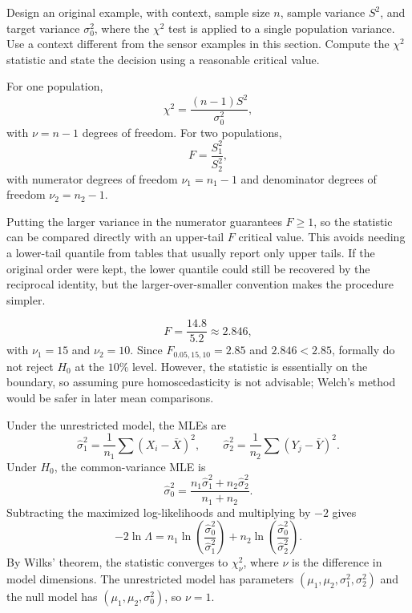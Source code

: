 \begin{problema}\label{prob:a0ad324}
Design an original example, with context, sample size $n$, sample variance $S^2$, and target variance $\sigma_0^2$, where the $\chi^2$ test is applied to a single population variance. Use a context different from the sensor examples in this section. Compute the $\chi^2$ statistic and state the decision using a reasonable critical value.
\end{problema}

\begin{solproblema}[prob:246a30e]
For one population,
\[
	\chi^2=\frac{(n-1)S^2}{\sigma_0^2},
\]
with $\nu=n-1$ degrees of freedom. For two populations,
\[
	F=\frac{S_1^2}{S_2^2},
\]
with numerator degrees of freedom $\nu_1=n_1-1$ and denominator degrees of freedom $\nu_2=n_2-1$.
\end{solproblema}

\begin{solproblema}
Putting the larger variance in the numerator guarantees $F\ge1$, so the statistic can be compared directly with an upper-tail $F$ critical value. This avoids needing a lower-tail quantile from tables that usually report only upper tails. If the original order were kept, the lower quantile could still be recovered by the reciprocal identity, but the larger-over-smaller convention makes the procedure simpler.
\end{solproblema}

\begin{solproblema}[prob:682c2b2]
\[
	F=\frac{14.8}{5.2}\approx2.846,
\]
with $\nu_1=15$ and $\nu_2=10$. Since $F_{0.05,15,10}=2.85$ and $2.846<2.85$, formally do not reject $H_0$ at the $10\%$ level. However, the statistic is essentially on the boundary, so assuming pure homoscedasticity is not advisable; Welch's method would be safer in later mean comparisons.
\end{solproblema}

\begin{solproblema}[prob:120019a]
Under the unrestricted model, the MLEs are
\[
	\hat\sigma_1^2=\frac1{n_1}\sum(X_i-\bar X)^2,\qquad
	\hat\sigma_2^2=\frac1{n_2}\sum(Y_j-\bar Y)^2.
\]
Under $H_0$, the common-variance MLE is
\[
	\hat\sigma_0^2=\frac{n_1\hat\sigma_1^2+n_2\hat\sigma_2^2}{n_1+n_2}.
\]
Subtracting the maximized log-likelihoods and multiplying by $-2$ gives
\[
	-2\ln\Lambda
	=n_1\ln\left(\frac{\hat\sigma_0^2}{\hat\sigma_1^2}\right)
	+n_2\ln\left(\frac{\hat\sigma_0^2}{\hat\sigma_2^2}\right).
\]
By Wilks' theorem, the statistic converges to $\chi^2_\nu$, where $\nu$ is the difference in model dimensions. The unrestricted model has parameters $(\mu_1,\mu_2,\sigma_1^2,\sigma_2^2)$ and the null model has $(\mu_1,\mu_2,\sigma_0^2)$, so $\nu=1$.
\end{solproblema}

